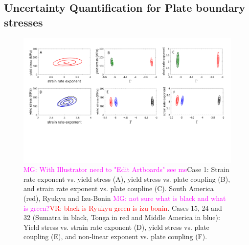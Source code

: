 \documentclass[12pt]{article}
\newcommand{\mgnote}[1]{\textcolor{magenta}{MG: #1}}
\newcommand{\vrnote}[1]{\textcolor{red}{VR: #1}}
\begin{document}
{\subsection{Uncertainty Quantification for Plate boundary stresses}

\begin{figure}[H]
\centering

\includegraphics[scale=0.35]{figure7new.pdf}%

\caption{ \mgnote{With Illustrator need to "Edit Artboards" see me}Case 1:  
Strain rate exponent vs. yield stress (A),  
yield stress vs. plate coupling (B), and 
strain rate exponent vs. plate coupline (C). South America (red), Ryukyu and Izu-Bonin \mgnote{not sure what is black and what is green?}\vrnote{black is Ryukyu green is izu-bonin}.
Cases 15, 24 and 32
 (Sumatra in black, Tonga in red and Middle America in blue):
Yield stress vs. strain rate exponent (D),
yield stress vs. plate coupling (E),
 and non-linear exponent vs. plate coupling (F).
}
\label{fig:distrib}
\end{figure}



}
\end{document}
